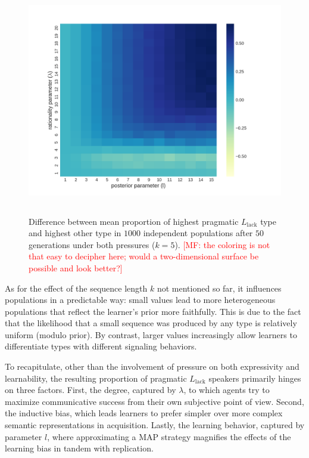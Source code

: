\documentclass[a4paper, 11pt]{article}
\theoremstyle{Satz}
\newcommand{\mf}[1]{\textcolor{Red}{[MF: #1]}}
\newcommand{\mylang}[1]{\ensuremath{L_{\text{#1}}}\xspace} %
\newcommand{\Llack}{\mylang{lack}}
\begin{document}
\begin{figure}[t]
\centering
\includegraphics[width=1\textwidth,height=10cm,keepaspectratio]{./plots/fig4-incumbents-difference}
\caption{Difference between mean proportion of highest pragmatic $\Llack$ type and highest
  other type in $1000$ independent populations after $50$ generations under both pressures ($k
  = 5$).  \mf{the coloring is not that
    easy to decipher here; would a two-dimensional surface be possible and look better?}}
\label{fig:diff}
\end{figure}

As for the effect of the sequence length $k$ not mentioned so far, it influences populations in
a predictable way: small values lead to more heterogeneous populations that reflect the
learner's prior more faithfully. This is due to the fact that the likelihood that a small
sequence was produced by any type is relatively uniform (modulo prior). By contrast, larger
values increasingly allow learners to differentiate types with different signaling behaviors.

To recapitulate, other than the involvement of pressure on both expressivity and learnability,
the resulting proportion of pragmatic $\Llack$ speakers primarily hinges on three
factors. First, the degree, captured by $\lambda$, to which agents try to maximize
communicative success from their own subjective point of view. Second, the inductive bias,
which leads learners to prefer simpler over more complex semantic representations in
acquisition. Lastly, the learning behavior, captured by parameter $l$, where approximating a
MAP strategy magnifies the effects of the learning bias in tandem with replication.
\end{document}
